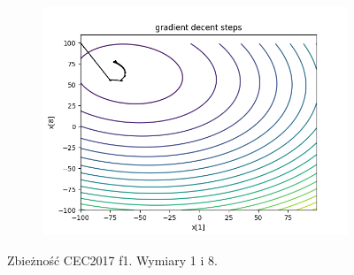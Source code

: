 \begin{figure}[h!]
\begin{subfigure}[b]{0.45\linewidth}
			\includegraphics[width=\linewidth]{photos/f1_3_0.png}
		\end{subfigure}
		\caption{Zbieżność CEC2017 f1. Wymiary 1 i 8.}
	\end{figure}
	\newpage
